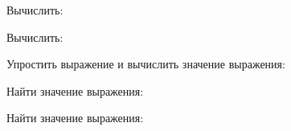 \begin{listofex}
	\item Вычислить:
	\begin{enumcols}[itemcolumns=2]
		\item {}
		\item {}
		\item {}
	\end{enumcols}
	\item Вычислить:
	\begin{enumcols}[itemcolumns=3]
		\item {}
		\item {}
		\item {}
	\end{enumcols}
	\item Упростить выражение и вычислить значение выражения:
	\begin{enumcols}[itemcolumns=1]
		\item {}
		\item {}
		\item {}
	\end{enumcols}
	\item Найти значение выражения:
	\begin{enumcols}[itemcolumns=2]
		\item {}
		\item {}
	\end{enumcols}
	\begin{enumcols}[itemcolumns=1, start=3]
		\item \vspace{-0,5em}
		\item {}
	\end{enumcols}
	\item Найти значение выражения:
	\begin{enumcols}[itemcolumns=1]
		\item {}
		\item {}\vspace{0,5em}
	\end{enumcols}
	\begin{enumcols}[itemcolumns=2, start=3]
		\item {}
		\item {}

\end{enumcols}
\end{listofex}
